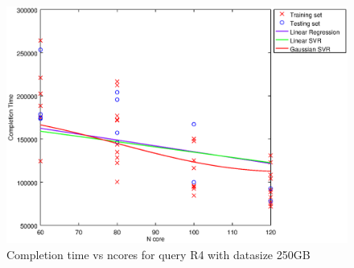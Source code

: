 
\begin {figure}[hbtp]
\centering
\includegraphics[width=\textwidth]{output/R4_250_LINEAR_NCORE/plot_R4_250_bestmodels.eps}
\caption{Completion time vs ncores for query R4 with datasize 250GB}
\label{fig:coreonly_linear_R4_250}
\end {figure}
